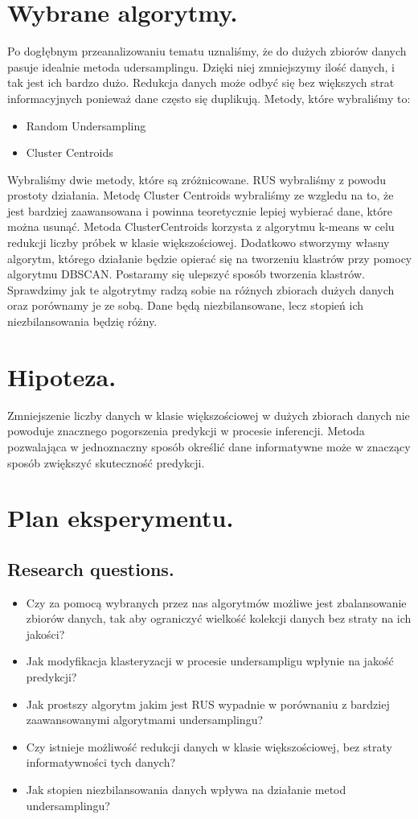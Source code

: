 \documentclass{article}
\begin{document}
\section{Wybrane algorytmy.}
Po dogłębnym przeanalizowaniu tematu uznaliśmy, że do dużych zbiorów danych pasuje idealnie metoda udersamplingu. Dzięki niej zmniejszymy ilość danych,  i tak jest ich bardzo dużo. Redukcja danych może odbyć się bez większych strat informacyjnych ponieważ dane często się duplikują.  Metody, które wybraliśmy to:
\begin{itemize}
    \item Random Undersampling
    \item Cluster Centroids
\end{itemize}
Wybraliśmy dwie metody, które są zróżnicowane. RUS wybraliśmy z powodu prostoty działania. Metodę Cluster Centroids wybraliśmy ze wzgledu na to, że jest bardziej zaawansowana i powinna teoretycznie lepiej wybierać dane, które można usunąć. Metoda ClusterCentroids korzysta z algorytmu k-means w celu redukcji liczby próbek w klasie większościowej. Dodatkowo stworzymy własny algorytm, którego działanie będzie opierać się na tworzeniu klastrów przy pomocy algorytmu DBSCAN. Postaramy się ulepszyć sposób tworzenia klastrów.  Sprawdzimy jak te algotrytmy radzą sobie na różnych zbiorach dużych danych oraz porównamy je ze sobą. Dane będą niezbilansowane, lecz stopień ich niezbilansowania będzię różny. 

\section{Hipoteza.}
Zmniejszenie liczby danych w klasie większościowej w dużych zbiorach danych nie powoduje znacznego pogorszenia predykcji w procesie inferencji. Metoda pozwalająca w jednoznaczny sposób określić dane informatywne może  w znaczący sposób zwiększyć skuteczność predykcji.

\section{Plan eksperymentu.}
\subsection{Research questions.}
\begin{itemize}
    \item Czy za pomocą wybranych przez nas algorytmów możliwe jest zbalansowanie zbiorów danych, tak aby ograniczyć wielkość kolekcji danych bez straty na ich jakości?
    \item Jak modyfikacja  klasteryzacji w procesie undersampligu wpłynie na jakość predykcji?
    \item Jak prostszy algorytm jakim jest RUS wypadnie w porównaniu z bardziej zaawansowanymi algorytmami undersamplingu?
    \item Czy istnieje możliwość redukcji danych w klasie większościowej, bez straty informatywności tych danych?
    \item Jak stopien niezbilansowania danych wpływa na działanie metod undersamplingu?
\end{itemize}
\end{document}
